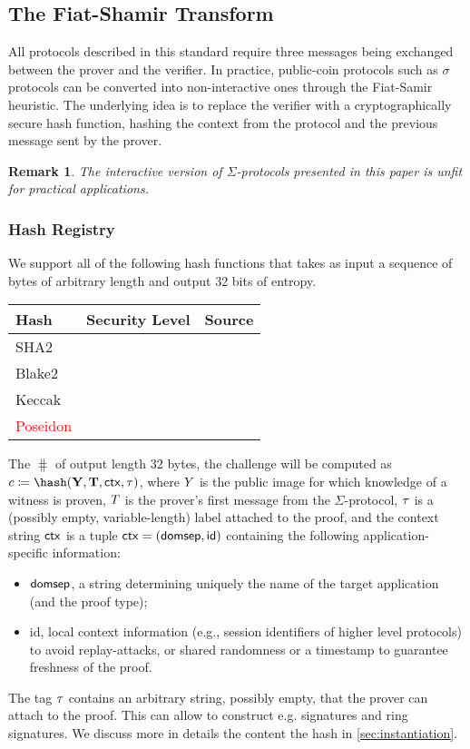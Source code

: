 \documentclass[runningheads,11pt]{article}
\newtheorem{remark}{Remark}
\newcommand{\unsure}[1]{\textcolor{red}{#1}}
\begin{document}
\subsection{The Fiat-Shamir Transform}\label{sec:fs}
All protocols described in this standard require three messages being exchanged between the prover and the verifier.
In practice, public-coin protocols such as $\sigma$ protocols can be converted into non-interactive ones through the Fiat-Samir heuristic.
The underlying idea is to replace the verifier with a cryptographically secure hash function, hashing the context from the protocol and the previous message sent by the prover.

\begin{remark}
The interactive version of $\Sigma$-protocols presented in this paper is unfit for practical applications.
\end{remark}

\subsubsection{Hash Registry}

We support all of the following hash functions that takes as input a sequence of bytes of arbitrary length and output 32 bits of entropy.

\begin{center}
  \begin{tabular}{lll}
  Hash & Security Level & Source \\
  \hline
  SHA2 \\
  Blake2 \\
  Keccak & \\
  \unsure{Poseidon} &\\
  \end{tabular}
\end{center}

The $\hash$ of output length 32 bytes, the challenge will be computed as
$c\defeq\hash(\vec \statement,\vec \commitment, \ctx, \stag)$,
where $Y$ is the public image for which knowledge of a witness is proven, $T$ is the prover's first message from the $\Sigma$-protocol, $\tau$ is a (possibly empty, variable-length) label attached to the proof, and
the context string $\mathsf{ctx}$ is a tuple $\mathsf{ctx} = (\textsf{domsep}, \textsf{id})$ containing the following application-specific information:
\begin{itemize}
  \item $\textsf{domsep}$, a string determining uniquely the name of the target application (and the proof type);
  \item \textsf{id},
    local context information (e.g., session identifiers of higher level protocols) to avoid replay-attacks, or shared randomness or a timestamp to guarantee freshness of the proof.
\end{itemize}
The tag $\tau$ contains an arbitrary string, possibly empty, that the prover can attach to the proof. This can allow to construct e.g. signatures and ring signatures.
We discuss more in details the content the hash in \cref{sec:instantiation}.
\end{document}
